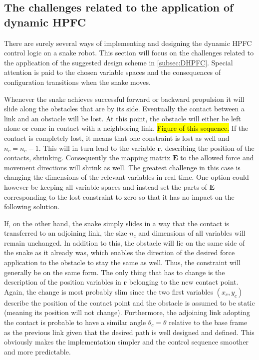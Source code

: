 \subsection{The challenges related to the application of dynamic HPFC}

There are surely several ways of implementing and designing the dynamic HPFC control logic on a snake robot. This section will focus on the challenges related to the application of the suggested design scheme in \ref{subsec:DHPFC}. Special attention is paid to the chosen variable spaces and the consequences of configuration transitions when the snake moves.

Whenever the snake achieves successful forward or backward propulsion it will slide along the obstacles that are by its side. Eventually the contact between a link and an obstacle will be lost. At this point, the obstacle will either be left alone or come in contact with a neighboring link. \hl{Figure of this sequence.} If the contact is completely lost, it means that one constraint is lost as well and $n_c = n_c - 1$. This will in turn lead to the variable $\mathbf{r}$, describing the position of the contacts, shrinking. Consequently the mapping matrix $\mathbf{E}$ to the allowed force and movement directions will shrink as well. The greatest challenge in this case is changing the dimensions of the relevant variables in real time. One option could however be keeping all variable spaces and instead set the parts of $\mathbf{E}$ corresponding to the lost constraint to zero so that it has no impact on the following solution.

If, on the other hand, the snake simply slides in a way that the contact is transferred to an adjoining link, the size $n_c$ and dimensions of all variables will remain unchanged. In addition to this, the obstacle will lie on the same side of the snake as it already was, which enables the direction of the desired force application to the obstacle to stay the same as well. Thus, the constraint will generally be on the same form. The only thing that has to change is the description of the position variables in $\mathbf{r}$ belonging to the new contact point. Again, the change is most probably slim since the two first variables $(x_c, y_c)$ describe the position of the contact point and the obstacle is assumed to be static (meaning its position will not change). Furthermore, the adjoining link adopting the contact is probable to have a similar angle $\theta_c = \theta$ relative to the base frame as the previous link given that the desired path is well designed and defined. This obviously makes the implementation simpler and the control sequence smoother and more predictable.

